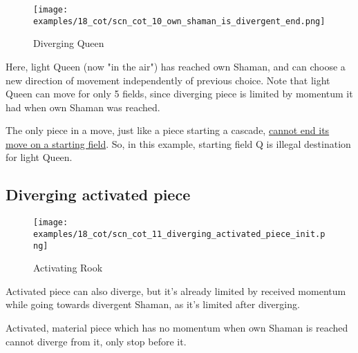 \clearpage %

\vspace*{-2.1\baselineskip}
\noindent
\begin{figure}[!h]
\texttt{[image: examples/18\_cot/scn\_cot\_10\_own\_shaman\_is\_divergent\_end.png]}
\vspace*{-1.3\baselineskip}
\caption{Diverging Queen}
\label{fig:scn_cot_10_own_shaman_is_divergent_end}
\end{figure}

\vspace*{-0.4\baselineskip}
Here, light Queen (now "in the air") has reached own Shaman, and can choose a new
direction of movement independently of previous choice. Note that light Queen can
move for only 5 fields, since diverging piece is limited by momentum it had when
own Shaman was reached.

The only piece in a move, just like a piece starting a cascade,
\hyperref[fig:scn_mv_43_static_move_is_illegal_init]{cannot end its move on a starting field}.
So, in this example, starting field Q is illegal destination for light Queen.

\clearpage %

\subsection*{Diverging activated piece}
\label{sec:Conquest of Tlalocan/Divergence/Diverging activated piece}

\vspace*{-1.4\baselineskip}
\noindent
\begin{figure}[!h]
\texttt{[image: examples/18\_cot/scn\_cot\_11\_diverging\_activated\_piece\_init.png]}
\vspace*{-1.3\baselineskip}
\caption{Activating Rook}
\label{fig:scn_cot_11_diverging_activated_piece_init}
\end{figure}

\vspace*{-0.4\baselineskip}
Activated piece can also diverge, but it's already limited by received momentum
while going towards divergent Shaman, as it's limited after diverging.

Activated, material piece which has no momentum when own Shaman is reached cannot
diverge from it, only stop before it.

